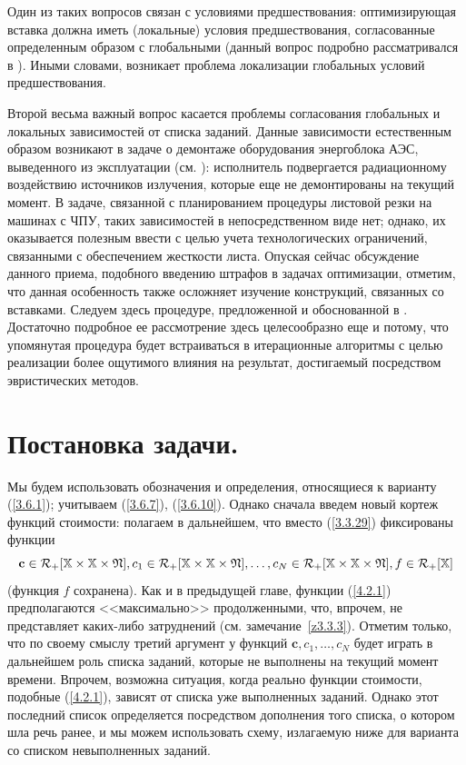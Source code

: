 \documentclass[11pt,twoside,openany]{report}
\newcommand{\bfn}{\begin{equation}}
\newcommand{\efn}{\end{equation}}
\newcommand{\car}{{\cal R}}
\newcommand{\bbx}{{\mathbb X}}
\begin{document}
{Один из таких вопросов  связан с условиями предшествования: оптимизирующая
вставка должна иметь (локальные) условия предшествования, согласованные
определенным образом с глобальными (данный вопрос подробно рассматривался
в \cite{Cha14`}). Иными словами, возникает проблема локализации глобальных
условий предшествования.

Второй весьма важный вопрос касается проблемы согласования глобальных и
локальных зависимостей от списка заданий. Данные зависимости естественным
образом возникают в задаче о демонтаже оборудования энергоблока АЭС,
выведенного из эксплуатации (см. \cite{Cha2`}): исполнитель подвергается
радиационному воздействию источников излучения, которые еще не демонтированы
на текущий момент. В задаче, связанной с планированием процедуры листовой
резки на машинах с ЧПУ, таких зависимостей в непосредственном виде нет;
однако, их оказывается полезным ввести с целью учета технологических
ограничений, связанными с обеспечением жесткости листа. Опуская сейчас
обсуждение данного приема, подобного введению штрафов в задачах оптимизации,
отметим, что данная особенность также осложняет изучение конструкций,
связанных со вставками. Следуем здесь процедуре, предложенной и обоснованной
в \cite{Cha13`}. Достаточно подробное ее рассмотрение здесь целесообразно
еще и потому, что упомянутая процедура будет встраиваться в итерационные
алгоритмы с целью реализации более ощутимого влияния на результат,
достигаемый посредством эвристических методов.


\section{Постановка задачи.}
\setcounter{equation}{0}

Мы будем использовать обозначения и определения, относящиеся к варианту
(\ref{3.6.1}); учитываем (\ref{3.6.7}), (\ref{3.6.10}). Однако сначала введем
новый кортеж функций стоимости: полагаем в дальнейшем, что вместо (\ref{3.3.29})
фиксированы функции
\bfn\label{4.2.1}
\mathbf{c}\in \car_+[\bbx\times \bbx\times \mathfrak{N}], c_1\in \car_+
[\bbx\times \bbx\times \mathfrak{N}],\ldots,c_N\in \car_+[\bbx\times
\bbx\times \mathfrak{N}], f\in \car_+[\bbx]
\efn
(функция $f$ сохранена). Как и в предыдущей главе, функции (\ref{4.2.1})
предполагаются <<максимально>> продолженными, что, впрочем, не представляет
каких-либо затруднений (см. замечание~\ref{z3.3.3}). Отметим только, что по
своему смыслу третий аргумент у функций $\mathbf{c}, c_1,\ldots,c_N$ будет
играть в дальнейшем роль списка заданий, которые  не выполнены на текущий
момент времени. Впрочем, возможна ситуация, когда реально функции стоимости,
подобные (\ref{4.2.1}), зависят  от списка уже выполненных заданий. Однако
этот последний список определяется посредством дополнения того списка, о
котором шла речь ранее, и мы можем использовать схему, излагаемую ниже для
варианта со списком невыполненных заданий.

}
\end{document}
